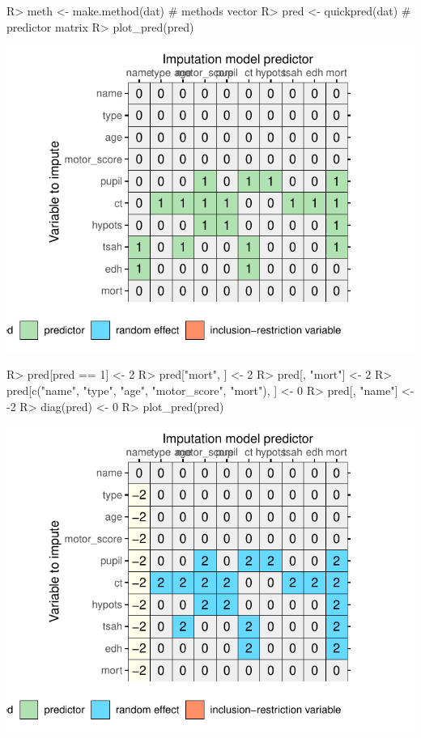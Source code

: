 \documentclass[
]{jss}
\begin{document}
\begin{CodeChunk}
\begin{CodeInput}
R> meth <- make.method(dat) # methods vector
R> pred <- quickpred(dat)   # predictor matrix
R> plot_pred(pred)
\end{CodeInput}


\begin{center}\includegraphics{Imputation_of_Incomplete_Multilevel_Data_files/figure-latex/impact-1} \end{center}

\begin{CodeInput}
R> pred[pred == 1] <- 2
R> pred["mort", ] <- 2
R> pred[, "mort"] <- 2
R> pred[c("name", "type", "age", "motor_score", "mort"), ] <- 0
R> pred[, "name"] <- -2
R> diag(pred) <- 0
R> plot_pred(pred)
\end{CodeInput}


\begin{center}\includegraphics{Imputation_of_Incomplete_Multilevel_Data_files/figure-latex/impact-2} \end{center}


\end{CodeChunk}
\end{document}

